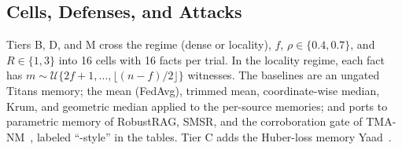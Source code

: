 \documentclass[journal]{IEEEtran}
\theoremstyle{remark}
\begin{document}
\begin{table}[!t]
\caption{Experimental Tiers (Confirmatory Trials Are Fresh Within Each Tier)}
\label{tab:setup}
\centering\footnotesize
\setlength{\tabcolsep}{3pt}
\end{table}

\subsection{Cells, Defenses, and Attacks}
Tiers B, D, and M cross the regime (dense or locality), $f$, $\rho\in\{0.4,0.7\}$, and $R\in\{1,3\}$ into 16 cells with 16 facts per trial. In the locality regime, each fact has $m\sim\mathcal{U}\{2f+1,\dots,\lfloor(n-f)/2\rfloor\}$ witnesses. The baselines are an ungated Titans memory; the mean (FedAvg), trimmed mean, coordinate-wise median, Krum, and geometric median applied to the per-source memories; and ports to parametric memory of RobustRAG, SMSR, and the corroboration gate of \mbox{TMA-NM}~\cite{louck2026tma}, labeled ``-style'' in the tables. Tier C adds the Huber-loss memory Yaad~\cite{behrouz2025miras}.
\end{document}
